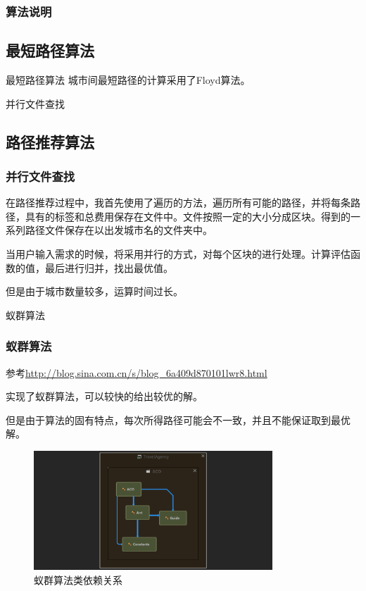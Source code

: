 \documentclass{beamer}
\begin{document}
\begin{frame}
\frametitle{算法说明}
\subsection{最短路径算法}
\begin{block}{最短路径算法}
城市间最短路径的计算采用了Floyd算法。
\end{block}

\begin{block}{并行文件查找}
\subsection{路径推荐算法}
\subsubsection{并行文件查找}
在路径推荐过程中，我首先使用了遍历的方法，遍历所有可能的路径，并将每条路径，具有的标签和总费用保存在文件中。文件按照一定的大小分成区块。得到的一系列路径文件保存在以出发城市名的文件夹中。\par
当用户输入需求的时候，将采用并行的方式，对每个区块的进行处理。计算评估函数的值，最后进行归并，找出最优值。\par
但是由于城市数量较多，运算时间过长。
\end{block}
\end{frame}

\begin{frame}
\begin{block}{蚁群算法}
\subsubsection{蚁群算法}
参考\url{http://blog.sina.com.cn/s/blog_6a409d870101lwr8.html}\par
实现了蚁群算法，可以较快的给出较优的解。\par
但是由于算法的固有特点，每次所得路径可能会不一致，并且不能保证取到最优解。
\begin{figure}[H]
\centering
\includegraphics[width=0.8\textwidth]{7.png}
\caption{蚁群算法类依赖关系} 
\end{figure}
\end{block}
\end{frame}
\end{document}
